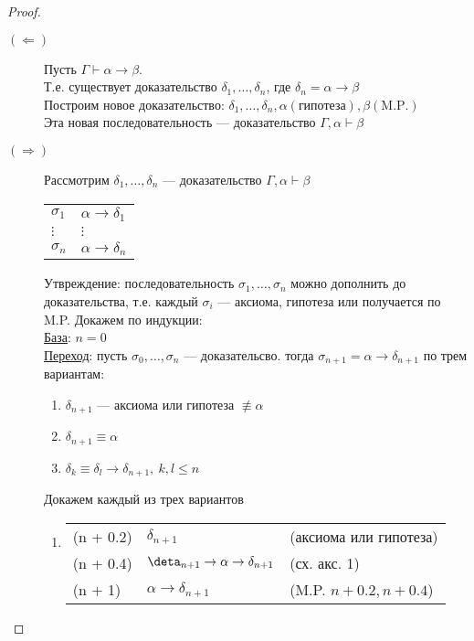 \documentclass[english]{article}
\theoremstyle{plain}
\theoremstyle{remark}
\theoremstyle{definition}
\begin{document}
\begin{proof}
\-
\begin{description}
\item[{\((\Leftarrow)\)}] Пусть \(\Gamma \vdash \alpha \to \beta\). \\
Т.е. существует доказательство \(\delta_1, \dots, \delta_n\), где \(\delta_n = \alpha \to \beta\) \\
Построим новое доказательство: \(\delta_1, \dots, \delta_n, \alpha(\text{гипотеза}), \beta(\text{M.P.})\) \\
Эта новая последовательность --- доказательство \(\Gamma, \alpha \vdash \beta\)
\item[{\((\Rightarrow)\)}] Рассмотрим \(\delta_1, \dots, \delta_n\) --- доказательство \(\Gamma, \alpha \vdash \beta\)
\begin{center}
\begin{tabular}{ll}
\(\sigma_1\) & \(\alpha \to \delta_1\)\\
\(\vdots\) & \(\vdots\)\\
\(\sigma_n\) & \(\alpha \to \delta_n\)\\
\end{tabular}
\end{center}
Утвреждение: последовательность \(\sigma_1, \dots, \sigma_n\) можно дополнить до доказательства, т.е. каждый \(\sigma_i\) --- аксиома, гипотеза или получается по M.P. Докажем по индукции: \\
\uline{База}: \(n = 0\) \\
\uline{Переход}: пусть \(\sigma_0, \dots, \sigma_n\) --- доказательсво. тогда \(\sigma_{n + 1} = \alpha \to \delta_{n + 1}\) по трем вариантам:
\begin{enumerate}
\item \(\delta_{n + 1}\) --- аксиома или гипотеза \(\not\equiv \alpha\)
\item \(\delta_{n + 1} \equiv \alpha\)
\item \(\delta_k \equiv \delta_l \to \delta_{n + 1},\ k,l\le n\)
\end{enumerate}
Докажем каждый из трех вариантов
\begin{enumerate}
\item \-
\begin{center}
\begin{tabular}{l|ll}
(n + 0.2) & \(\delta_{n + 1}\) & (аксиома или гипотеза)\\
(n + 0.4) & \(\deta_{n + 1} \to \alpha \to \delta_{n + 1}\) & (сх. акс. 1)\\
(n + 1) & \(\alpha \to \delta_{n + 1}\) & (M.P. \(n + 0.2, n + 0.4\))\\

\end{tabular}
\end{center}
\end{enumerate}
\end{description}
\end{proof}
\end{document}
